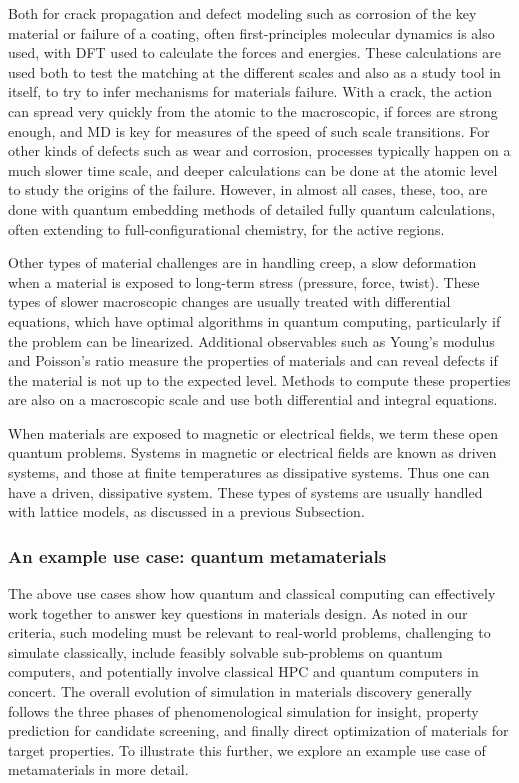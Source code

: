    Both for crack propagation and defect modeling such as corrosion of the key material or failure of a coating, often first-principles molecular dynamics is also used, with DFT used to calculate the forces and energies. These calculations are used both to test the matching at the different scales and also as a study tool in itself, to try to infer mechanisms for materials failure. With a crack, the action can spread very quickly from the atomic to the macroscopic, if forces are strong enough, and MD is key for measures of the speed of such scale transitions. For other kinds of defects such as wear and corrosion, processes typically happen on a much slower time scale, and deeper calculations can be done at the atomic level to study the origins of the failure. However, in almost all cases, these, too, are done with quantum embedding methods of detailed fully quantum calculations, often extending to full-configurational chemistry, for the active regions.

   Other types of material challenges are in handling creep, a slow deformation when a material is exposed to long-term stress (pressure, force, twist). These types of slower macroscopic changes are usually treated with differential equations, which have optimal algorithms in quantum computing, particularly if the problem can be linearized. Additional observables such as Young's modulus and Poisson's ratio measure the properties of materials and can reveal defects if the material is not up to the expected level. Methods to compute these properties are also on a macroscopic scale and use both differential and integral equations. 

   When materials are exposed to magnetic or electrical fields, we term these open quantum problems. Systems in magnetic or electrical fields are known as driven systems, and those at finite temperatures as dissipative systems. Thus one can have a driven, dissipative system. These types of systems are usually handled with lattice models, as discussed in a previous Subsection.

\subsubsection{An example use case: quantum metamaterials}

The above use cases show how quantum and classical computing can effectively work together to answer key questions in materials design.  As noted in our criteria, such modeling must be relevant to real-world problems, challenging to simulate classically, include feasibly solvable sub-problems on quantum computers, and potentially involve classical HPC and quantum computers in concert.  The overall evolution of simulation in materials discovery generally follows the three phases of phenomenological simulation for insight, property prediction for candidate screening, and finally direct optimization of materials for target properties.  To illustrate this further, we explore an example use case of metamaterials in more detail.

